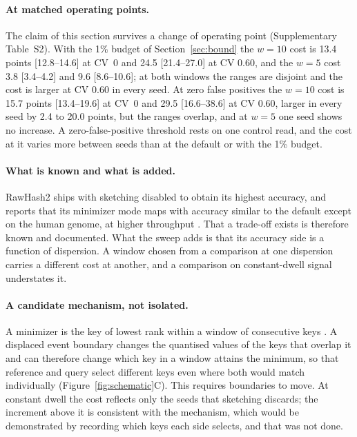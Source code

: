 \documentclass[11pt,a4paper]{article}
\begin{document}
\paragraph{At matched operating points.} The claim of this section survives a change of operating
point (Supplementary Table~S2). With the 1\% budget of Section~\ref{sec:bound} the $w = 10$ cost is
13.4 points [12.8--14.6] at CV~0 and 24.5 [21.4--27.0] at CV 0.60, and the $w = 5$ cost
3.8 [3.4--4.2] and 9.6 [8.6--10.6]; at both windows the ranges are disjoint and the cost is larger at
CV 0.60 in every seed. At zero false positives the $w = 10$ cost is 15.7 points [13.4--19.6] at CV~0
and 29.5 [16.6--38.6] at CV 0.60, larger in every seed by 2.4 to 20.0 points, but the ranges
overlap, and at $w = 5$ one seed shows no increase. A zero-false-positive threshold rests on one
control read, and the cost at it varies more between seeds than at the default or with the 1\%
budget.

\paragraph{What is known and what is added.} RawHash2 ships with sketching disabled to obtain its
highest accuracy, and reports that its minimizer mode maps with accuracy similar to the default
except on the human genome, at higher throughput \citep{firtina2024rawhash2}. That a trade-off
exists is therefore known and documented. What the sweep adds is that its accuracy side is a
function of dispersion. A window chosen from a comparison at one dispersion carries a different
cost at another, and a comparison on constant-dwell signal understates it.

\paragraph{A candidate mechanism, not isolated.} A minimizer is the key of lowest rank within a
window of consecutive keys \citep{roberts2004minimizers}. A displaced event boundary changes the
quantised values of the keys that overlap it and can therefore change which key in a window
attains the minimum, so that reference and query select different keys even where both would
match individually (Figure~\ref{fig:schematic}C). This requires boundaries to move. At constant dwell the cost reflects only the
seeds that sketching discards; the increment above it is consistent with the mechanism, which
would be demonstrated by recording which keys each side selects, and that was not done.
\end{document}
